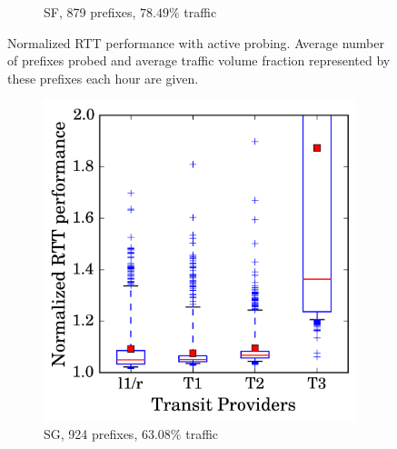 \begin{figure}
\begin{subfigure}[b]{0.48\textwidth}
                \caption{SF, 879 prefixes, $78.49\%$ traffic}
                \label{fig:np_sf}
        \end{subfigure}
\caption{Normalized RTT performance with active probing. Average number of prefixes probed and average traffic volume fraction represented by these prefixes each hour are given.}
\label{fig:np}
\end{figure}
\begin{figure}\ContinuedFloat
	\centering
        \begin{subfigure}[b]{0.48\textwidth}
                \includegraphics[width=\textwidth]{gfx/chap2/np_box_sg.png}
                \caption{SG, 924 prefixes, $63.08\%$ traffic}
                \label{fig:np_sg}
        \end{subfigure}
        \begin{subfigure}[b]{0.48\textwidth}

\end{subfigure}
\end{figure}
